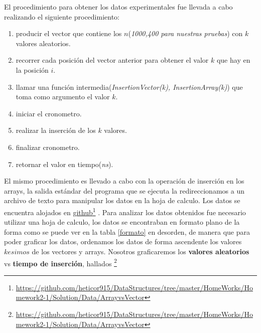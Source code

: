 \documentclass[paper=a4, fontsize=12pt]{article} 		%
\newcommand\fnurl[2]{%
\href{#2}{#1}\footnote{\url{#2}}%
}
\numberwithin{equation}{section}						%
\numberwithin{table}{section} 							%
\begin{document}

El procedimiento para obtener los datos experimentales fue llevada a cabo realizando el siguiente procedimiento:
\begin{enumerate}
\item producir el vector que contiene los $n$(\textit{1000,400 para nuestras pruebas}) con $k$ valores aleatorios.
\item recorrer cada posición del vector anterior para obtener el valor $k$ que hay en la posición $i$.
\item llamar una función intermedia(\textit{InsertionVector(k), InsertionArray(k)})  que toma como argumento el valor $k$.
\item iniciar el cronometro.
\item realizar la inserción de los $k$ valores.
\item finalizar cronometro.
\item retornar el valor en tiempo(\textit{ns}).
\end{enumerate}
El mismo procedimiento es llevado a cabo con la operación de inserción en los arrays, la salida estándar del programa que se ejecuta la redireccionamos a un archivo de texto para manipular los datos en la hoja de calculo. Los datos se encuentra alojados en \fnurl{github}{https://github.com/heticor915/DataStructures/tree/master/HomeWorks/Homework2-1/Solution/Data/ArrayvsVector}. 
Para analizar los datos obtenidos fue necesario utilizar una hoja de calculo, los datos se encontraban en formato plano de la forma como se puede ver en la tabla \ref{formato} en desorden, de manera que para poder graficar los datos,  ordenamos los datos de forma ascendente los valores $kesimos$ de los vectores y arrays. Nosotros graficaremos los \textbf{valores aleatorios } vs \textbf{tiempo de inserción}, hallados \fnurl{}{https://github.com/heticor915/DataStructures/tree/master/HomeWorks/Homework2-1/Solution/Data/ArrayvsVector}
\end{document}
